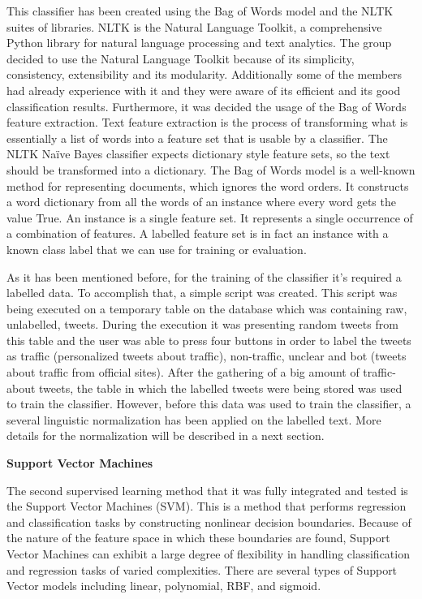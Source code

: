 This classifier has been created using the Bag of Words model and the NLTK suites of libraries. NLTK is the Natural Language Toolkit, a comprehensive Python library for natural language processing and text analytics. The group decided to use the Natural Language Toolkit because of its simplicity, consistency, extensibility and its modularity. Additionally some of the members had already experience with it and they were aware of its efficient and its good classification results. Furthermore, it was decided the usage of the Bag of Words feature extraction. Text feature extraction is the process of transforming what is essentially a list of words into a feature set that is usable by a classifier. The NLTK Naïve Bayes classifier expects dictionary style feature sets, so the text should be transformed into a dictionary. The Bag of Words model is a well-known method for representing documents, which ignores the word orders. It constructs a word dictionary from all the words of an instance where every word gets the value True. An instance is a single feature set. It represents a single occurrence of a combination of features. A labelled feature set is in fact an instance with a known class label that we can use for training or evaluation.

As it has been mentioned before, for the training of the classifier it’s required a labelled data. To accomplish that, a simple script was created. This script was being executed on a temporary table on the database which was containing raw, unlabelled, tweets. During the execution it was presenting random tweets from this table and the user was able to press four buttons in order to label the tweets as traffic (personalized tweets about traffic), non-traffic, unclear and bot (tweets about traffic from official sites). After the gathering of a big amount of traffic-about tweets, the table in which the labelled tweets were being stored was used to train the classifier. However, before this data was used to train the classifier, a several linguistic normalization has been applied on the labelled text.  More details for the normalization will be described in a next section.

\textbf{Support Vector Machines}

The second supervised learning method that it was fully integrated and tested is the Support Vector Machines (SVM). This is a method that performs regression and classification tasks by constructing nonlinear decision boundaries. Because of the nature of the feature space in which these boundaries are found, Support Vector Machines can exhibit a large degree of flexibility in handling classification and regression tasks of varied complexities. There are several types of Support Vector models including linear, polynomial, RBF, and sigmoid.

